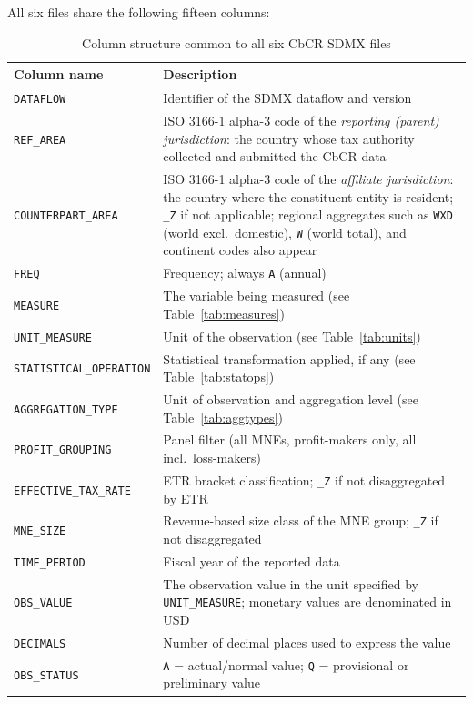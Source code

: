 \documentclass[11pt,a4paper]{article}
\newcommand{\code}[1]{\texttt{#1}}
\begin{document}
All six files share the following fifteen columns:

\begin{table}[H]
\centering
\caption{Column structure common to all six CbCR SDMX files}
\label{tab:columns}
\begin{tabular}{@{}lp{9.5cm}@{}}
\toprule
Column name & Description \\
\midrule
\code{DATAFLOW} & Identifier of the SDMX dataflow and version \\
\code{REF\_AREA} & ISO 3166-1 alpha-3 code of the \emph{reporting (parent) jurisdiction}: the country whose tax authority collected and submitted the CbCR data \\
\code{COUNTERPART\_AREA} & ISO 3166-1 alpha-3 code of the \emph{affiliate jurisdiction}: the country where the constituent entity is resident; \code{\_Z} if not applicable; regional aggregates such as \code{WXD} (world excl.\ domestic), \code{W} (world total), and continent codes also appear \\
\code{FREQ} & Frequency; always \code{A} (annual) \\
\code{MEASURE} & The variable being measured (see Table~\ref{tab:measures}) \\
\code{UNIT\_MEASURE} & Unit of the observation (see Table~\ref{tab:units}) \\
\code{STATISTICAL\_OPERATION} & Statistical transformation applied, if any (see Table~\ref{tab:statops}) \\
\code{AGGREGATION\_TYPE} & Unit of observation and aggregation level (see Table~\ref{tab:aggtypes}) \\
\code{PROFIT\_GROUPING} & Panel filter (all MNEs, profit-makers only, all incl.\ loss-makers) \\
\code{EFFECTIVE\_TAX\_RATE} & ETR bracket classification; \code{\_Z} if not disaggregated by ETR \\
\code{MNE\_SIZE} & Revenue-based size class of the MNE group; \code{\_Z} if not disaggregated \\
\code{TIME\_PERIOD} & Fiscal year of the reported data \\
\code{OBS\_VALUE} & The observation value in the unit specified by \code{UNIT\_MEASURE}; monetary values are denominated in USD \\
\code{DECIMALS} & Number of decimal places used to express the value \\
\code{OBS\_STATUS} & \code{A} = actual/normal value; \code{Q} = provisional or preliminary value \\
\bottomrule
\end{tabular}
\end{table}
\end{document}
